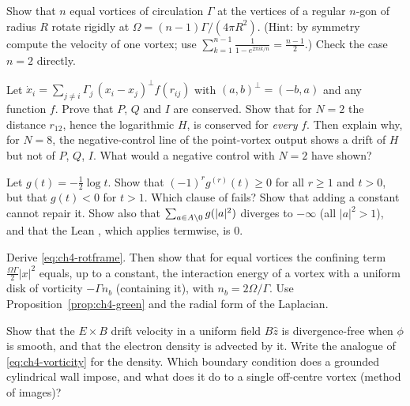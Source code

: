 \begin{exercise}\label{ex:ch4-ring}
Show that $n$ equal vortices of circulation $\Gamma$ at the vertices of a regular $n$-gon of radius $R$ rotate
rigidly at $\Omega=(n-1)\Gamma/(4\pi R^2)$. (Hint: by symmetry compute the velocity of one vortex; use
$\sum_{k=1}^{n-1}\frac{1}{1-e^{2\pi i k/n}}=\frac{n-1}{2}$.) Check the case $n=2$ directly.
\end{exercise}

\begin{exercise}\label{ex:ch4-impulse}
Let $\dot x_i = \sum_{j\neq i}\Gamma_j\,(x_i-x_j)^{\perp}f(r_{ij})$ with $(a,b)^\perp=(-b,a)$ and any function $f$.
Prove that $P$, $Q$ and $I$ are conserved. Show that for $N=2$ the distance $r_{12}$, hence the logarithmic $H$,
is conserved for \emph{every} $f$. Then explain why, for $N=8$, the negative-control line of the point-vortex output
shows a drift of $H$ but not of $P$, $Q$, $I$. What would a negative control with $N=2$ have shown?
\end{exercise}

\begin{exercise}\label{ex:ch4-log}
Let $g(t)=-\frac12\log t$. Show that $(-1)^r g^{(r)}(t)\ge0$ for all $r\ge1$ and $t>0$, but that $g(t)<0$ for
$t>1$. Which clause of  fails? Show that adding a constant cannot repair it. Show also
that $\sum_{a\in A\setminus0}g(|a|^2)$ diverges to $-\infty$ (all $|a|^2>1$), and that the Lean , which applies  termwise, is $0$.
\end{exercise}

\begin{exercise}\label{ex:ch4-rot}
Derive \eqref{eq:ch4-rotframe}. Then show that for equal vortices the confining term $\frac{\Omega\Gamma}{2}|x|^2$
equals, up to a constant, the interaction energy of a vortex with a uniform disk of vorticity $-\Gamma n_b$
(containing it), with $n_b=2\Omega/\Gamma$. Use Proposition~\ref{prop:ch4-green} and the radial form of the
Laplacian.
\end{exercise}

\begin{exercise}\label{ex:ch4-drift}
Show that the $E\times B$ drift velocity in a uniform field $B\hat z$ is divergence-free when $\phi$ is smooth, and
that the electron density is advected by it. Write the analogue of \eqref{eq:ch4-vorticity} for the density.
Which boundary condition does a grounded cylindrical wall impose, and what does it do to a single off-centre
vortex (method of images)?
\end{exercise}

